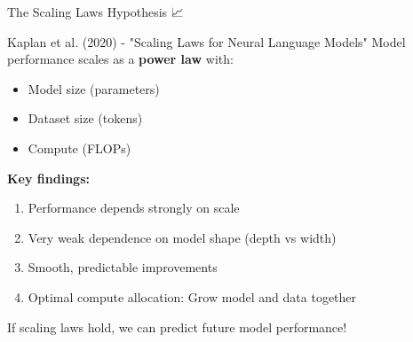 \documentclass[aspectratio=169]{beamer}
\begin{document}
\begin{frame}[shrink=10]{The Scaling Laws Hypothesis 📈}
\small
    \begin{block}{Kaplan et al. (2020) - "Scaling Laws for Neural Language Models"}
        Model performance scales as a \textbf{power law} with:
        \begin{itemize}\setlength{\itemsep}{0pt}
            \item Model size (parameters)
            \item Dataset size (tokens)
            \item Compute (FLOPs)
        \end{itemize}
    \end{block}

    \vspace{0.3cm}

    \textbf{Key findings:}
    \begin{enumerate}\setlength{\itemsep}{0pt}
        \item Performance depends strongly on scale
        \item Very weak dependence on model shape (depth vs width)
        \item Smooth, predictable improvements
        \item Optimal compute allocation: Grow model and data together
    \end{enumerate}

    \vspace{0.3cm}

    \begin{thinkaboutit}
        If scaling laws hold, we can predict future model performance!
    \end{thinkaboutit}
\end{frame}
\end{document}
